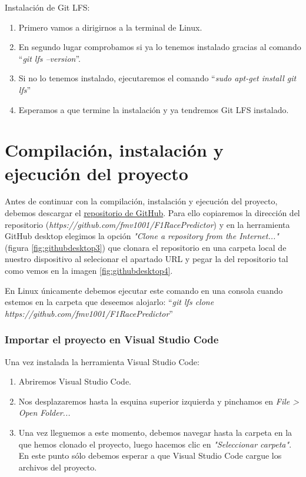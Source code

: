 Instalación de Git LFS:

\begin{enumerate}
    \item Primero vamos a dirigirnos a la terminal de Linux.
    \item En segundo lugar comprobamos si ya lo tenemos instalado gracias al comando ``\textit{git lfs --version}''.
    \item Si no lo tenemos instalado, ejecutaremos el comando ``\textit{sudo apt-get install git lfs}''
    \item Esperamos a que termine la instalación y ya tendremos Git LFS instalado.
\end{enumerate}

\section{Compilación, instalación y ejecución del proyecto}

Antes de continuar con la compilación, instalación y ejecución del proyecto, debemos descargar el \href{https://github.com/fmv1001/F1RacePredictor}{repositorio de GitHub}.
Para ello copiaremos la dirección del repositorio (\textit{https://github.com/fmv1001/F1RacePredictor}) y en la herramienta GitHub desktop elegimos la opción \textit{"Clone a repository from the Internet..."} (figura \ref{fig:githubdesktop3}) que clonara el repositorio en una carpeta local de nuestro dispositivo al selecionar el apartado URL y pegar la del repositorio tal como vemos en la imagen \ref{fig:githubdesktop4}.


En Linux únicamente debemos ejecutar este comando en una consola cuando estemos en la carpeta que deseemos alojarlo: ``\textit{git lfs clone https://github.com/fmv1001/F1RacePredictor}''

\subsubsection{Importar el proyecto en Visual Studio Code}\label{importtovsc}

Una vez instalada la herramienta Visual Studio Code:

\begin{enumerate}
    \item Abriremos Visual Studio Code.
    \item Nos desplazaremos hasta la esquina superior izquierda y pinchamos en \textit{File > Open Folder...}
    \item Una vez lleguemos a este momento, debemos navegar hasta la carpeta en la que hemos clonado el proyecto, luego hacemos clic en \textit{"Seleccionar carpeta"}. En este punto sólo debemos esperar a que Visual Studio Code cargue los archivos del proyecto.
\end{enumerate}

